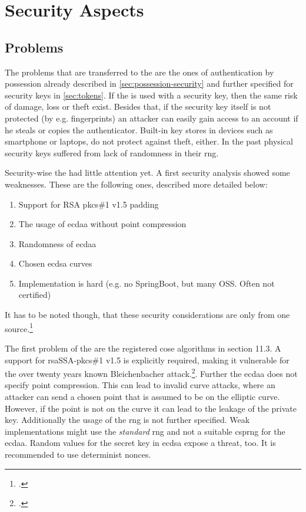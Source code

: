 \section{Security Aspects}


\subsection{Problems}

The problems that are transferred to the \wa{} are the ones of authentication by possession already described in \autoref{sec:possession-security} and further specified for security keys in \autoref{sec:tokens}. If the \wa{} is used with a security key, then the same risk of damage, loss or theft exist. Besides that, if the security key itself is not protected (by e.g. fingerprints) an attacker can easily gain access to an account if he steals or copies the authenticator. Built-in key stores in devices such as smartphone or laptops, do not protect against theft, either. In the past physical security keys suffered from lack of randomness in their \gls{rng}.

Security-wise the \wa{} had little attention yet. A first security analysis showed some weaknesses. These are the following ones, described more detailed below:

\begin{enumerate}
	\item Support for RSA \gls{pkcs}\#1 v1.5 padding
	\item The usage of \gls{ecdaa} without point compression
	\item Randomness of \gls{ecdaa}
	\item Chosen \gls{ecdsa} curves
 	\item Implementation is hard (e.g. no SpringBoot, but many OSS. Often not certified)
\end{enumerate}

It has to be noted though, that these security considerations are only from one source.\footcite[See][]{paragon-webauth}

The first problem of the \wa{} are the registered \gls{cose} algorithms in section 11.3. A support for \gls{rsa}SSA-\gls{pkcs}\#1 v1.5 is explicitly required, making it vulnerable for the over twenty years known \frqq Bleichenbacher attack\flqq.\footcites[See][]{10.1007/BFb0055716}. Further the \gls{ecdaa} does not specify point compression. This can lead to invalid curve attacks, where an attacker can send a chosen point that is assumed to be on the elliptic curve. However, if the point is not on the curve it can lead to the leakage of the private key. Additionally the usage of the \gls{rng} is not further specified. Weak implementations might use the \textit{standard} \gls{rng} and not a suitable \gls{csprng} for the \gls{ecdaa}. Random values for the secret key in \gls{ecdsa} expose a threat, too. It is recommended to use determinist \glspl{nonce}.

